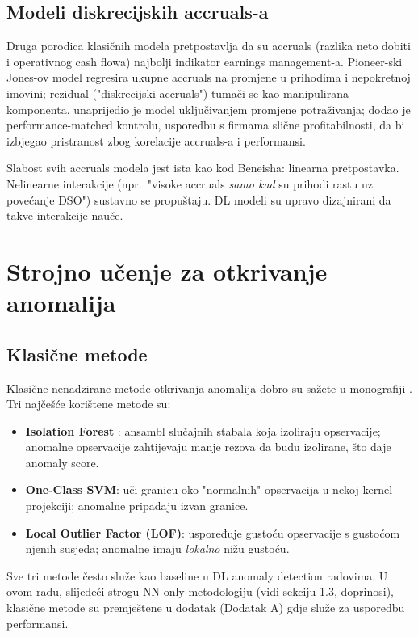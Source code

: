 \documentclass[diplomskirad,authoryear]{fer}
\begin{document}
\subsection{Modeli diskrecijskih accruals-a}

Druga porodica klasičnih modela pretpostavlja da su accruals (razlika neto dobiti i operativnog cash flowa) najbolji indikator earnings management-a. Pioneer-ski Jones-ov model \citep{jones1991} regresira ukupne accruals na promjene u prihodima i nepokretnoj imovini; rezidual ("diskrecijski accruals") tumači se kao manipulirana komponenta. \citet{dechow1995} unaprijedio je model uključivanjem promjene potraživanja; \citet{kothari2005} dodao je performance-matched kontrolu, usporedbu s firmama slične profitabilnosti, da bi izbjegao pristranost zbog korelacije accruals-a i performansi.

Slabost svih accruals modela jest ista kao kod Beneisha: linearna pretpostavka. Nelinearne interakcije (npr.\ "visoke accruals \emph{samo kad} su prihodi rastu uz povećanje DSO") sustavno se propuštaju. DL modeli su upravo dizajnirani da takve interakcije nauče.

\section{Strojno učenje za otkrivanje anomalija}

\subsection{Klasične metode}

Klasične nenadzirane metode otkrivanja anomalija dobro su sažete u monografiji \citet{aggarwal2017}. Tri najčešće korištene metode su:
\begin{itemize}
 \item \textbf{Isolation Forest} \citep{liu2008}: ansambl slučajnih stabala koja izoliraju opservacije; anomalne opservacije zahtijevaju manje rezova da budu izolirane, što daje anomaly score.
 \item \textbf{One-Class SVM}: uči granicu oko "normalnih" opservacija u nekoj kernel-projekciji; anomalne pripadaju izvan granice.
 \item \textbf{Local Outlier Factor (LOF)}: uspoređuje gustoću opservacije s gustoćom njenih susjeda; anomalne imaju \emph{lokalno} nižu gustoću.
\end{itemize}

Sve tri metode često služe kao baseline u DL anomaly detection radovima. U ovom radu, slijedeći strogu NN-only metodologiju (vidi sekciju 1.3, doprinosi), klasične metode su premještene u dodatak (Dodatak A) gdje služe za usporedbu performansi.
\end{document}
